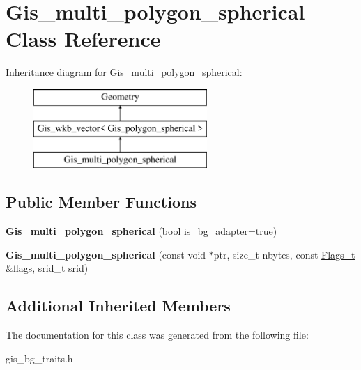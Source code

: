 \hypertarget{classGis__multi__polygon__spherical}{}\section{Gis\+\_\+multi\+\_\+polygon\+\_\+spherical Class Reference}
\label{classGis__multi__polygon__spherical}
Inheritance diagram for Gis\+\_\+multi\+\_\+polygon\+\_\+spherical\+:\begin{figure}[H]
\begin{center}
\leavevmode
\includegraphics[height=3.000000cm]{classGis__multi__polygon__spherical}
\end{center}
\end{figure}
\subsection*{Public Member Functions}
\begin{DoxyCompactItemize}
\item 
\mbox{\label{classGis__multi__polygon__spherical_ae335022ed8776a9a0ffea4f415fab463}} 
{\bfseries Gis\+\_\+multi\+\_\+polygon\+\_\+spherical} (bool \mbox{\hyperlink{classGeometry_ada614004627a9e7af129e51a34242af9}{is\+\_\+bg\+\_\+adapter}}=true)
\item 
\mbox{\label{classGis__multi__polygon__spherical_ae21e71f701da5c394966fc9cedbc5a89}} 
{\bfseries Gis\+\_\+multi\+\_\+polygon\+\_\+spherical} (const void $\ast$ptr, size\+\_\+t nbytes, const \mbox{\hyperlink{classGeometry_1_1Flags__t}{Flags\+\_\+t}} \&flags, srid\+\_\+t srid)
\end{DoxyCompactItemize}
\subsection*{Additional Inherited Members}


The documentation for this class was generated from the following file\+:\begin{DoxyCompactItemize}
\item 
gis\+\_\+bg\+\_\+traits.\+h\end{DoxyCompactItemize}
